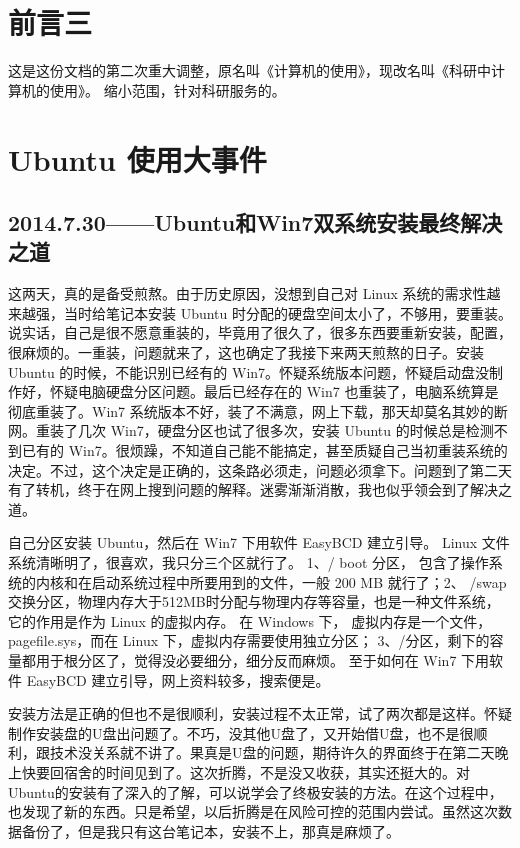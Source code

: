 \documentclass[a4paper,11pt,twoside]{book}
\newcommand{\sanhao}{\fontsize{15.75pt}{\baselineskip}\selectfont}
\begin{document}
\section*{前言三}
这是这份文档的第二次重大调整，原名叫《计算机的使用》，现改名叫《科研中计算机的使用》。
缩小范围，针对科研服务的。

 








\section*{Ubuntu 使用大事件}
\subsection*{2014.7.30——Ubuntu和Win7双系统安装最终解决之道}
这两天，真的是备受煎熬。由于历史原因，没想到自己对 Linux 系统的需求性越来越强，当时给笔记本安装 Ubuntu 时分配的硬盘空间太小了，不够用，要重装。说实话，自己是很不愿意重装的，毕竟用了很久了，很多东西要重新安装，配置，很麻烦的。一重装，问题就来了，这也确定了我接下来两天煎熬的日子。安装 Ubuntu 的时候，不能识别已经有的 Win7。怀疑系统版本问题，怀疑启动盘没制作好，怀疑电脑硬盘分区问题。最后已经存在的 Win7 也重装了，电脑系统算是彻底重装了。Win7 系统版本不好，装了不满意，网上下载，那天却莫名其妙的断网。重装了几次 Win7，硬盘分区也试了很多次，安装 Ubuntu 的时候总是检测不到已有的 Win7。很烦躁，不知道自己能不能搞定，甚至质疑自己当初重装系统的决定。不过，这个决定是正确的，这条路必须走，问题必须拿下。问题到了第二天有了转机，终于在网上搜到问题的解释。迷雾渐渐消散，我也似乎领会到了解决之道。

自己分区安装 Ubuntu，然后在 Win7 下用软件 EasyBCD 建立引导。 Linux 文件系统清晰明了，很喜欢，我只分三个区就行了。 1、/ boot 分区， 包含了操作系统的内核和在启动系统过程中所要用到的文件，一般 200 MB 就行了；2、 /swap 交换分区，物理内存大于512MB时分配与物理内存等容量，也是一种文件系统，它的作用是作为 Linux 的虚拟内存。 在 Windows 下， 虚拟内存是一个文件， pagefile.sys，而在 Linux 下，虚拟内存需要使用独立分区； 3、/分区，剩下的容量都用于根分区了，觉得没必要细分，细分反而麻烦。 至于如何在 Win7 下用软件 EasyBCD 建立引导，网上资料较多，搜索便是。

安装方法是正确的但也不是很顺利，安装过程不太正常，试了两次都是这样。怀疑制作安装盘的U盘出问题了。不巧，没其他U盘了，又开始借U盘，也不是很顺利，跟技术没关系就不讲了。果真是U盘的问题，期待许久的界面终于在第二天晚上快要回宿舍的时间见到了。这次折腾，不是没又收获，其实还挺大的。对Ubuntu的安装有了深入的了解，可以说学会了终极安装的方法。在这个过程中，也发现了新的东西。只是希望，以后折腾是在风险可控的范围内尝试。虽然这次数据备份了，但是我只有这台笔记本，安装不上，那真是麻烦了。
\end{document}
